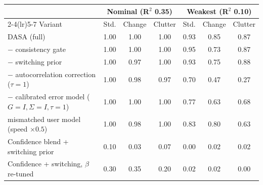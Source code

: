 \begin{tabular}{l ccc ccc}
\toprule
& \multicolumn{3}{c}{Nominal (R$^2$ 0.35)} & \multicolumn{3}{c}{Weakest (R$^2$ 0.10)} \\
\cmidrule(lr){2-4}\cmidrule(lr){5-7}
Variant & Std. & Change & Clutter & Std. & Change & Clutter \\
\midrule
DASA (full) & 1.00 & 1.00 & 1.00 & 0.93 & 0.85 & 0.87 \\
$-$ consistency gate & 1.00 & 1.00 & 1.00 & 0.95 & 0.73 & 0.87 \\
$-$ switching prior & 1.00 & 0.97 & 1.00 & 0.93 & 0.75 & 0.88 \\
$-$ autocorrelation correction ($\tau{=}1$) & 1.00 & 0.98 & 0.97 & 0.70 & 0.47 & 0.27 \\
$-$ calibrated error model ($G{=}I,\Sigma{=}I,\tau{=}1$) & 1.00 & 1.00 & 1.00 & 0.77 & 0.63 & 0.68 \\
mismatched user model (speed $\times0.5$) & 1.00 & 0.98 & 1.00 & 0.83 & 0.80 & 0.63 \\
Confidence blend + switching prior & 0.10 & 0.03 & 0.07 & 0.00 & 0.02 & 0.02 \\
Confidence + switching, $\beta$ re-tuned & 0.30 & 0.35 & 0.20 & 0.02 & 0.02 & 0.00 \\
\bottomrule
\end{tabular}
